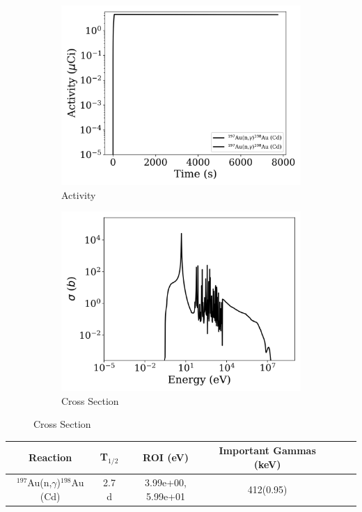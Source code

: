\begin{figure}[h]
\centering
\begin{subfigure}{.5\textwidth}
  \centering
     \includegraphics[width=.8\textwidth]{plot/Au-197(n,gamma)Au-198_Cd_wisconsin1} 

  \caption{Activity}
\end{subfigure}%
\begin{subfigure}{.5\textwidth}
  \centering
     \includegraphics[width=.8\textwidth]{plot/Au-197(n,gamma)Au-198_Cd} 

  \caption{Cross Section}
\end{subfigure}
\end{figure}

\begin{table}[h]
\centering
\begin{tabular}{ |c|c|c|c|c|c|c| }
 \hline
 Reaction & T$_{1/2}$ & ROI (eV) & Important Gammas (keV) \\
 \hline 
 $^{197}$Au(n,$\gamma$)$^{198}$Au (Cd) &  2.7 d & 3.99e+00, 5.99e+01 & 412(0.95) \\ 
\hline
\end{tabular}
\end{table}

